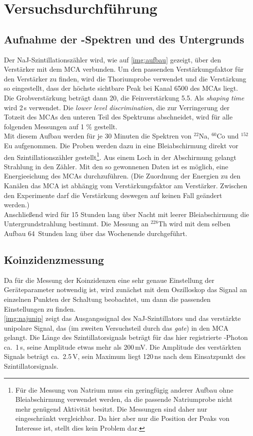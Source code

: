 \section{Versuchsdurchführung}

\subsection{Aufnahme der \textgamma-Spektren und des Untergrunds}
Der NaJ-Szintillationszähler wird, wie auf \autoref{img:aufbau} gezeigt, über den Verstärker mit
dem MCA verbunden.
Um den passenden Verstärkungsfaktor für den Verstärker zu finden, wird die Thoriumprobe verwendet
und die Verstärkung so eingestellt, dass der höchste sichtbare Peak bei Kanal 6500 des MCAs liegt.
Die Grobverstärkung beträgt dann 20, die Feinverstärkung 5.5. Als \emph{shaping time} wird 2\,\textmu s verwendet.
Die \emph{lower level discrimination}, die zur Verringerung der Totzeit des MCAs den unteren Teil des
Spektrums abschneidet, wird für alle folgenden Messungen auf 1 \% gestellt.\\
Mit diesem Aufbau werden für je 30 Minuten die Spektren von ${}^{22}$Na, ${}^{60}$Co und ${}^{152}$Eu aufgenommen.
Die Proben werden dazu in eine Bleiabschirmung direkt vor den Szintillationszähler gestellt\footnote{Für die
Messung von Natrium muss ein geringfügig anderer Aufbau ohne Bleiabschirmung verwendet werden,
da die passende Natriumprobe nicht mehr genügend Aktivität besitzt.
Die Messungen sind daher nur eingeschränkt vergleichbar.
Da hier aber nur die Position der Peaks von Interesse ist, stellt dies kein Problem dar.}.
Aus einem Loch in der Abschirmung gelangt Strahlung in den Zähler.
Mit den so gewonnenen Daten ist es möglich, eine Energieeichung des MCAs durchzuführen.
(Die Zuordnung der Energien zu den Kanälen das MCA ist abhängig vom  Verstärkungsfaktor am Verstärker.
Zwischen den Experimente darf die Verstärkung deswegen auf keinen Fall geändert werden.)\\
Anschließend wird für 15 Stunden lang über Nacht mit leerer Bleiabschirmung die Untergrundstrahlung bestimmt.
Die Messung an ${}^{228}$Th wird mit dem selben Aufbau 64~Stunden lang über das Wochenende durchgeführt.



\subsection{Koinzidenzmessung}

Da für die Messung der Koinzidenzen eine sehr genaue Einstellung der Geräteparameter notwendig ist,
wird zunächst mit dem Oszilloskop das Signal an einzelnen Punkten der Schaltung beobachtet,
um dann die passenden Einstellungen zu finden.\\
\autoref{img:najunip} zeigt das Ausgangssignal des NaJ-Szintillators und das verstärkte unipolare Signal,
das (im zweiten Versuchsteil durch das \emph{gate}) in den MCA gelangt.
Die Länge des Szintillatorsignals beträgt für das hier registrierte \textgamma-Photon ca.~1\,\textmu s,
seine Amplitude etwas mehr als 200\,mV.
Die Amplitude des verstärkten Signals beträgt ca.~2.5\,V,
sein Maximum liegt 120\,ns nach dem Einsatzpunkt des Szintillatorsignals.

